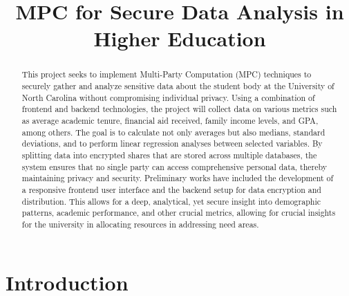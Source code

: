 \documentclass[conference]{IEEEtran}
\begin{document}
\title{MPC for Secure Data Analysis in Higher Education}


\author{
\and
{}
\and
{}
\and
{}
\and
{}
}

\maketitle

\begin{abstract}

This project seeks to implement Multi-Party Computation (MPC) techniques to securely gather and analyze sensitive data about the student body at the University of North Carolina without compromising individual privacy.
Using a combination of frontend and backend technologies, the project will collect data on various metrics such as average academic tenure, financial aid received, family income levels, and GPA, among others. 
The goal is to calculate not only averages but also medians, standard deviations, and to perform linear regression analyses between selected variables. 
By splitting data into encrypted shares that are stored across multiple databases, the system ensures that no single party can access comprehensive personal data, thereby maintaining privacy and security. 
Preliminary works have included the development of a responsive frontend user interface and the backend setup for data encryption and distribution. 
This allows for a deep, analytical, yet secure insight into demographic patterns, academic performance, and other crucial metrics, allowing for crucial insights for the university in allocating resources in addressing need areas. 

\end{abstract}


\section{Introduction}


\end{document}
